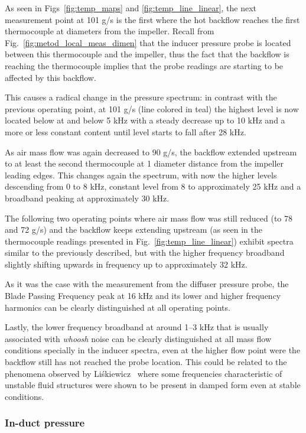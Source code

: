 As seen in Figs~\ref{fig:temp_maps} and \ref{fig:temp_line_linear}, the next measurement point at 101 g/s is the first where the hot backflow reaches the first thermocouple at  diameters from the impeller. Recall from Fig.~\ref{fig:metod_local_meas_dimen} that the inducer pressure probe is located between this thermocouple and the impeller, thus the fact that the backflow is reaching the thermocouple implies that the probe readings are starting to be affected by this backflow.

This causes a radical change in the pressure spectrum: in contrast with the previous operating point, at 101 g/s (line colored in teal) the highest level is now located below at and below 5 kHz with a steady decrease up to 10 kHz and a more or less constant content until level starts to fall after 28 kHz.

As air mass flow was again decreased to 90 g/s, the backflow extended upstream to at least the second thermocouple at 1 diameter distance from the impeller leading edges. This changes again the spectrum, with now the higher levels descending from 0 to 8 kHz, constant level from 8 to approximately 25 kHz and a broadband peaking at approximately 30 kHz.

The following two operating points where air mass flow was still reduced (to 78 and 72 g/s) and the backflow keeps extending upstream (as seen in the thermocouple readings presented in Fig.~\ref{fig:temp_line_linear}) exhibit spectra similar to the previously described, but with the higher frequency broadband slightly shifting upwards in frequency up to approximately 32 kHz.

As it was the case with the measurement from the diffuser pressure probe, the Blade Passing Frequency peak at 16 kHz and its lower and higher frequency harmonics can be clearly distinguished at all operating points.

Lastly, the lower frequency broadband at around 1--3 kHz that is usually associated with \emph{whoosh} noise can be clearly distinguished at all mass flow conditions specially in the inducer spectra, even at the higher flow point were the backflow still has not reached the probe location. This could be related to the phenomena observed by Li\'skiewicz~\cite{liskiewicz2014id} where some frequencies characteristic of unstable fluid structures were shown to be present in damped form even at stable conditions.

\subsubsection{In-duct pressure}

